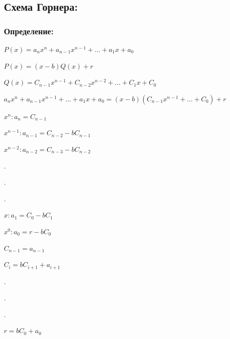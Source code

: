 \documentclass[12pt]{article}
\begin{document}
    \subsection{Схема Горнера:}
    \subsubsection{Определение:}
    $P(x) = a_{n}x^{n} + a_{n-1}x^{n-1} + ... + a_{1}x + a_{0}$\par
    $P(x)=(x-b)Q(x) + r$\par
    $Q(x) = C_{n-1}x^{n-1} + C_{n-2}x^{n-2} + ... + C_{1}x + C_{0}$\par
    $a_{n}x^{n} + a_{n-1}x^{n-1} + ... + a_{1}x + a_{0} = (x-b)(C_{n-1}x^{n-1} + ... + C_{0}) + r$\par
    $x^{n}: a_{n} = C_{n-1}$\par
    $x^{n-1}: a_{n-1} = C_{n-2} - bC_{n-1}$\par
    $x^{n-2}: a_{n-2} = C_{n-3} - bC_{n-2}$\par
    $.$\par
    $.$\par
    $.$\par
    $x: a_{1} = C_{0} - bC_{1}$\par
    $x^{0}: a_{0} = r - bC_{0}$\par
    $C_{n-1} = a_{n-1}$\par
    $C_{i} = bC_{i+1} + a_{i+1}$\par
    $.$\par
    $.$\par
    $.$\par
    $r = bC_{0} + a_{0}$\par
\end{document}
